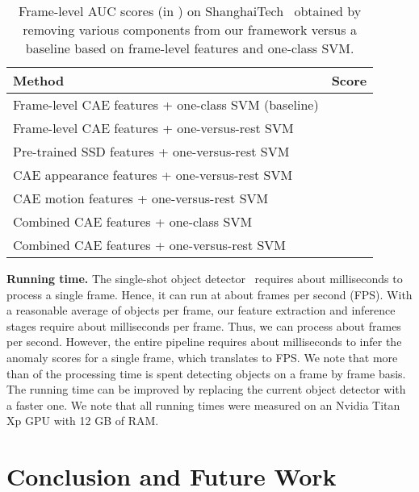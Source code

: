 \documentclass[10pt,twocolumn,letterpaper]{article}
\begin{document}
\begin{table}[t]
\setlength\tabcolsep{4.0pt}
\small{
\begin{center}
\begin{tabular}{|l|c|}
\hline
Method 																			& Score  \\
\hline
\hline
Frame-level CAE features	+ one-class SVM (baseline)		&  \\
\hline
Frame-level CAE features	+ one-versus-rest SVM				&  \\
Pre-trained SSD features + one-versus-rest SVM				&  \\
CAE appearance features + one-versus-rest SVM				&  \\
CAE motion features + one-versus-rest SVM						&  \\
Combined CAE features + one-class SVM							&  \\
\hline
Combined CAE features + one-versus-rest SVM				&  \\
\hline
\end{tabular}
\end{center}
\vspace*{-0.15cm}
\caption{Frame-level AUC scores (in ) on ShanghaiTech~\cite{Luo-ICCV-2017} obtained by removing various components from our framework versus a baseline based on frame-level features and one-class SVM. \label{tab_ablation}}
}
\vspace*{-0.7cm}
\end{table}

\noindent
{\bf Running time.}
The single-shot object detector~\cite{Lin-CVPR-2017} requires about  milliseconds to process a single frame. Hence, it can run at about  frames per second (FPS). With a reasonable average of  objects per frame, our feature extraction and inference stages require about  milliseconds per frame. Thus, we can process about  frames per second. However, the entire pipeline requires about  milliseconds to infer the anomaly scores for a single frame, which translates to  FPS. We note that more than  of the processing time is spent detecting objects on a frame by frame basis. The running time can be improved by replacing the current object detector with a faster one. We note that all running times were measured on an Nvidia Titan Xp GPU with 12 GB of RAM.

\vspace*{-0.2cm}
\section{Conclusion and Future Work}
\label{sec_Conclusion}
\vspace*{-0.1cm}
\end{document}

